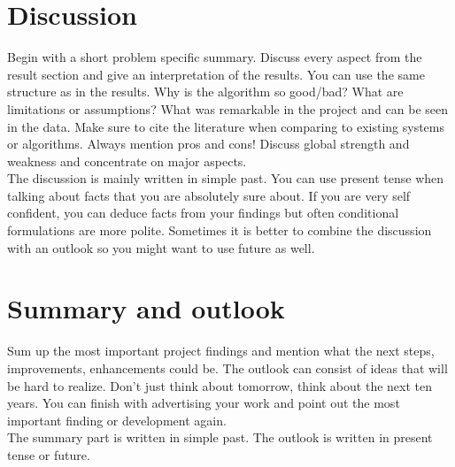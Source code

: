 \section{Discussion}
Begin with a short problem specific summary. Discuss every aspect from the result section and give an interpretation of the results. You can use the same structure as in the results. Why is the algorithm so good/bad? What are limitations or assumptions? What was remarkable in the project and can be seen in the data. Make sure to cite the literature when comparing to existing systems or algorithms. Always mention pros and cons! Discuss global strength and weakness and concentrate on major aspects.\\
The discussion is mainly written in simple past. You can use present tense when talking about facts that you are absolutely sure about. If you are very self confident, you can deduce facts from your findings but often conditional formulations are more polite. Sometimes it is better to combine the discussion with an outlook so you might want to use future as well. 
 
\section{Summary and outlook}
Sum up the most important project findings and mention what the next steps, improvements, enhancements could be. The outlook can consist of ideas that will be hard to realize. Don't just think about tomorrow, think about the next ten years. You can finish with advertising your work and point out the most important finding or development again.\\
The summary part is written in simple past. The outlook is written in present tense or future.

